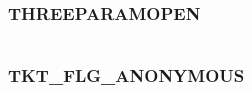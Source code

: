 \documentclass[letterpaper,10pt,english]{sphinxmanual}
\begin{document}
\begin{fulllineitems}
\label{appdev/refs/macros/SALT_TYPE_NO_LENGTH:SALT_TYPE_NO_LENGTH}
\end{fulllineitems}


\begin{tabulary}{\linewidth}{|L|L|}
\hline

 & 
\\
\hline\end{tabulary}



\subsubsection{THREEPARAMOPEN}
\label{appdev/refs/macros/THREEPARAMOPEN:threeparamopen}\label{appdev/refs/macros/THREEPARAMOPEN:threeparamopen-data}\label{appdev/refs/macros/THREEPARAMOPEN::doc}

\begin{fulllineitems}
\label{appdev/refs/macros/THREEPARAMOPEN:THREEPARAMOPEN}
\end{fulllineitems}


\begin{tabulary}{\linewidth}{|L|L|}
\hline

 & 
\\
\hline\end{tabulary}



\subsubsection{TKT\_FLG\_ANONYMOUS}
\label{appdev/refs/macros/TKT_FLG_ANONYMOUS::doc}\label{appdev/refs/macros/TKT_FLG_ANONYMOUS:tkt-flg-anonymous}\label{appdev/refs/macros/TKT_FLG_ANONYMOUS:tkt-flg-anonymous-data}

\begin{fulllineitems}
\label{appdev/refs/macros/TKT_FLG_ANONYMOUS:TKT_FLG_ANONYMOUS}
\end{fulllineitems}


\begin{tabulary}{\linewidth}{|L|L|}
\hline

 & 
\\
\hline\end{tabulary}
\end{document}
